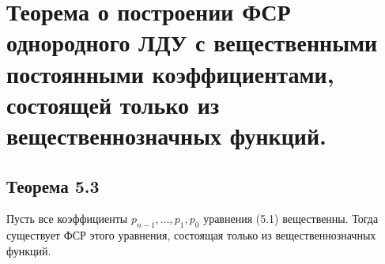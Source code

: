 {
	\section{Теорема о построении ФСР однородного ЛДУ с вещественными постоянными коэффициентами, состоящей
	только из вещественнозначных функций.}

	\subsection*{Теорема 5.3}

	Пусть все коэффициенты \( p_{n-1}, \ldots, p_1, p_0 \) уравнения (5.1) вещественны. Тогда существует ФСР этого уравнения, состоящая только из вещественнозначных функций.


	\newpage
}